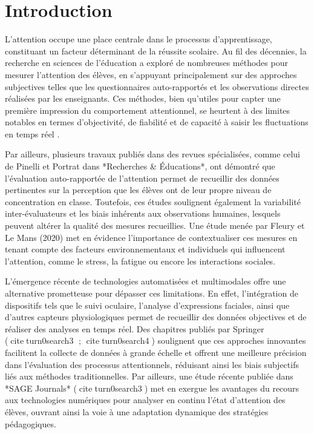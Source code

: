 \section{Introduction}

L’attention occupe une place centrale dans le processus d’apprentissage, constituant un facteur déterminant de la réussite scolaire. Au fil des décennies, la recherche en sciences de l’éducation a exploré de nombreuses méthodes pour mesurer l’attention des élèves, en s’appuyant principalement sur des approches subjectives telles que les questionnaires auto-rapportés et les observations directes réalisées par les enseignants. Ces méthodes, bien qu’utiles pour capter une première impression du comportement attentionnel, se heurtent à des limites notables en termes d’objectivité, de fiabilité et de capacité à saisir les fluctuations en temps réel \cite{Pinelli_Portrat_2023}.

Par ailleurs, plusieurs travaux publiés dans des revues spécialisées, comme celui de Pinelli et Portrat dans *Recherches \& Éducations*, ont démontré que l’évaluation auto-rapportée de l’attention permet de recueillir des données pertinentes sur la perception que les élèves ont de leur propre niveau de concentration en classe. Toutefois, ces études soulignent également la variabilité inter-évaluateurs et les biais inhérents aux observations humaines, lesquels peuvent altérer la qualité des mesures recueillies. Une étude menée par Fleury et Le Mans (2020) met en évidence l’importance de contextualiser ces mesures en tenant compte des facteurs environnementaux et individuels qui influencent l’attention, comme le stress, la fatigue ou encore les interactions sociales.

L’émergence récente de technologies automatisées et multimodales offre une alternative prometteuse pour dépasser ces limitations. En effet, l’intégration de dispositifs tels que le suivi oculaire, l’analyse d’expressions faciales, ainsi que d’autres capteurs physiologiques permet de recueillir des données objectives et de réaliser des analyses en temps réel. Des chapitres publiés par Springer (citeturn0search3 ; citeturn0search4) soulignent que ces approches innovantes facilitent la collecte de données à grande échelle et offrent une meilleure précision dans l’évaluation des processus attentionnels, réduisant ainsi les biais subjectifs liés aux méthodes traditionnelles. Par ailleurs, une étude récente publiée dans *SAGE Journals* (citeturn0search3) met en exergue les avantages du recours aux technologies numériques pour analyser en continu l’état d’attention des élèves, ouvrant ainsi la voie à une adaptation dynamique des stratégies pédagogiques.

